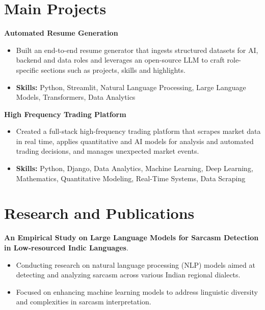 \documentclass[a4paper,11pt]{article}
\begin{document}
\section{\textbf{Main Projects}}

\vspace{1mm}
  \textbf{Automated Resume Generation  }
\vspace{-1.5mm} %
\begin{itemize}
  \item Built an end-to-end resume generator that ingests structured datasets for AI, backend and data roles and leverages an open-source LLM to craft role-specific sections such as projects, skills and highlights.
\vspace{-3mm}
  \item \textbf{Skills:} Python, Streamlit, Natural Language Processing, Large Language Models, Transformers, Data Analytics
\end{itemize}


\vspace{1mm}
   \textbf{High Frequency Trading Platform }
\vspace{-1.5mm} %
\begin{itemize}
  \item Created a full-stack high-frequency trading platform that scrapes market data in real time, applies quantitative and AI models for analysis and automated trading decisions, and manages unexpected market events.
\vspace{-3mm}
  \item \textbf{Skills:} Python, Django, Data Analytics, Machine Learning, Deep Learning, Mathematics, Quantitative Modeling, Real-Time Systems, Data Scraping
\end{itemize}



\section{\textbf{Research and Publications} \hfill }
\vspace{1mm}
  \textbf{An Empirical Study on Large Language Models for Sarcasm Detection in Low-resourced Indic Languages}.
\vspace{-1mm} %
\begin{itemize}
  \item Conducting research on natural language processing (NLP) models aimed at detecting and analyzing sarcasm across various Indian regional dialects.
\vspace{-3mm}
  \item Focused on enhancing machine learning models to address linguistic diversity and complexities in sarcasm interpretation.
\end{itemize}
\end{document}
